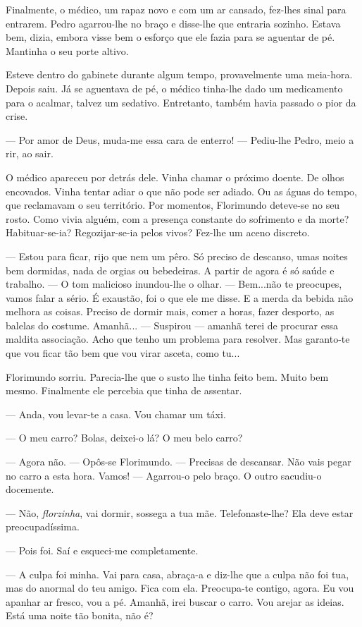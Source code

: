 Finalmente, o médico, um rapaz novo e com um ar cansado, fez-lhes sinal
para entrarem. Pedro agarrou-lhe no braço e disse-lhe que entraria
sozinho. Estava bem, dizia, embora visse bem o esforço que ele fazia
para se aguentar de pé. Mantinha o seu porte altivo.

Esteve dentro do gabinete durante algum tempo, provavelmente uma
meia-hora. Depois saiu. Já se aguentava de pé, o médico tinha-lhe dado
um medicamento para o acalmar, talvez um sedativo. Entretanto, também
havia passado o pior da crise.

--- Por amor de Deus, muda-me essa cara de enterro! --- Pediu-lhe Pedro,
meio a rir, ao sair.

O médico apareceu por detrás dele. Vinha chamar o próximo doente. De
olhos encovados. Vinha tentar adiar o que não pode ser adiado. Ou as
águas do tempo, que reclamavam o seu território. Por momentos,
Florimundo deteve-se no seu rosto. Como vivia alguém, com a presença
constante do sofrimento e da morte? Habituar-se-ia? Regozijar-se-ia
pelos vivos? Fez-lhe um aceno discreto.

--- Estou para ficar, rijo que nem um pêro. Só preciso de descanso, umas
noites bem dormidas, nada de orgias ou bebedeiras. A partir de agora é
só saúde e trabalho. --- O tom malicioso inundou-lhe o olhar. --- Bem...não
te preocupes, vamos falar a sério. É exaustão, foi o que ele me disse. E
a merda da bebida não melhora as coisas. Preciso de dormir mais, comer a
horas, fazer desporto, as balelas do costume. Amanhã... --- Suspirou ---
amanhã terei de procurar essa maldita associação. Acho que tenho um
problema para resolver. Mas garanto-te que vou ficar tão bem que vou
virar asceta, como tu...

Florimundo sorriu. Parecia-lhe que o susto lhe tinha feito bem. Muito
bem mesmo. Finalmente ele percebia que tinha de assentar.

--- Anda, vou levar-te a casa. Vou chamar um táxi.

--- O meu carro? Bolas, deixei-o lá? O meu belo carro?

--- Agora não. --- Opôs-se Florimundo. --- Precisas de descansar. Não vais
pegar no carro a esta hora. Vamos! --- Agarrou-o pelo braço. O outro
sacudiu-o docemente.

--- Não, \emph{florzinha}, vai dormir, sossega a tua mãe. Telefonaste-lhe? Ela
deve estar preocupadíssima.

--- Pois foi. Saí e esqueci-me completamente.

--- A culpa foi minha. Vai para casa, abraça-a e diz-lhe que a culpa não
foi tua, mas do anormal do teu amigo. Fica com ela. Preocupa-te contigo,
agora. Eu vou apanhar ar fresco, vou a pé. Amanhã, irei buscar o carro.
Vou arejar as ideias. Está uma noite tão bonita, não é?

